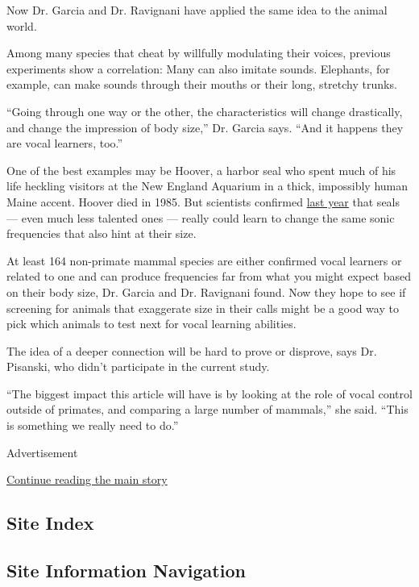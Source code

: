 Now Dr. Garcia and Dr. Ravignani have applied the same idea to the
animal world.

Among many species that cheat by willfully modulating their voices,
previous experiments show a correlation: Many can also imitate sounds.
Elephants, for example, can make sounds through their mouths or their
long, stretchy trunks.

``Going through one way or the other, the characteristics will change
drastically, and change the impression of body size,'' Dr. Garcia says.
``And it happens they are vocal learners, too.''

One of the best examples may be Hoover, a harbor seal who spent much of
his life heckling visitors at the New England Aquarium in a thick,
impossibly human Maine accent. Hoover died in 1985. But scientists
confirmed
\href{https://www.sciencedirect.com/science/article/pii/S0960982219306852}{last
year} that seals --- even much less talented ones --- really could learn
to change the same sonic frequencies that also hint at their size.

At least 164 non-primate mammal species are either confirmed vocal
learners or related to one and can produce frequencies far from what you
might expect based on their body size, Dr. Garcia and Dr. Ravignani
found. Now they hope to see if screening for animals that exaggerate
size in their calls might be a good way to pick which animals to test
next for vocal learning abilities.

The idea of a deeper connection will be hard to prove or disprove, says
Dr. Pisanski, who didn't participate in the current study.

``The biggest impact this article will have is by looking at the role of
vocal control outside of primates, and comparing a large number of
mammals,'' she said. ``This is something we really need to do.''

Advertisement

\protect\hyperlink{after-bottom}{Continue reading the main story}

\hypertarget{site-index}{%
\subsection{Site Index}\label{site-index}}

\hypertarget{site-information-navigation}{%
\subsection{Site Information
Navigation}\label{site-information-navigation}}

